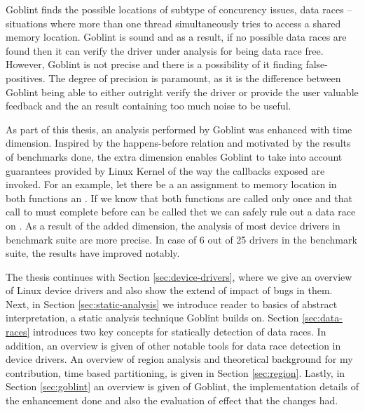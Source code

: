 \documentclass[..thesis.tex]{subfiles}
\begin{document}
Goblint finds the possible locations of subtype of concurency issues, data races -- situations where more than one thread simultaneously tries to access a shared memory location.
Goblint is sound and as a result, if no possible data races are found then it can verify the driver under analysis for being data race free.
However, Goblint is not precise and there is a possibility of it finding false-positives. The degree of precision is paramount,
as it is the difference between Goblint being able to either outright verify the driver or provide the user valuable feedback and the an result containing too much noise to be useful.
  

As part of this thesis, an analysis performed by Goblint was enhanced with time dimension. Inspired by the happens-before relation and motivated by the results of benchmarks done,
the extra dimension enables Goblint to take into account guarantees provided by Linux Kernel of the way the callbacks exposed are invoked.
For an example, let there be a an assignment to memory location  in both functions  an . 
If we know that both functions are called only once and that call to  must complete before  can be called thet we can safely rule out a data race on .
As a result of the added dimension, the analysis of most device drivers in benchmark suite are more precise. In case of 6 out of 25 drivers in the benchmark suite,
the results have improved notably.


The thesis continues with Section \ref{sec:device-drivers}, where we give an overview of Linux device drivers and also show the extend of impact of bugs in them.
Next, in Section \ref{sec:static-analysis} we introduce reader to basics of abstract interpretation, a static analysis technique Goblint builds on.
Section \ref{sec:data-races} introduces two key concepts for statically detection of data races.
In addition, an overview is given of other notable tools for data race detection in device drivers. An overview of region analysis and theoretical background for my contribution,
time based partitioning, is given in Section \ref{sec:region}. Lastly, in Section \ref{sec:goblint} an overview is given of Goblint,
the implementation details of the enhancement done  and also the evaluation of effect that the changes had.  
\end{document}

